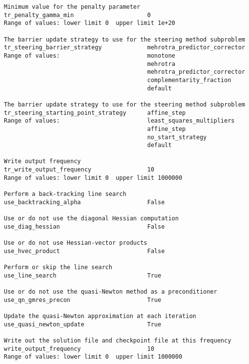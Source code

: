 \documentclass[12pt]{article}
\begin{document}
{\begin{verbatim}
Minimum value for the penalty parameter
tr_penalty_gamma_min                     0
Range of values: lower limit 0  upper limit 1e+20

The barrier update strategy to use for the steering method subproblem
tr_steering_barrier_strategy             mehrotra_predictor_corrector
Range of values:                         monotone
                                         mehrotra
                                         mehrotra_predictor_corrector
                                         complementarity_fraction
                                         default

The barrier update strategy to use for the steering method subproblem
tr_steering_starting_point_strategy      affine_step
Range of values:                         least_squares_multipliers
                                         affine_step
                                         no_start_strategy
                                         default

Write output frequency
tr_write_output_frequency                10
Range of values: lower limit 0  upper limit 1000000

Perform a back-tracking line search
use_backtracking_alpha                   False

Use or do not use the diagonal Hessian computation
use_diag_hessian                         False

Use or do not use Hessian-vector products
use_hvec_product                         False

Perform or skip the line search
use_line_search                          True

Use or do not use the quasi-Newton method as a preconditioner
use_qn_gmres_precon                      True

Update the quasi-Newton approximation at each iteration
use_quasi_newton_update                  True

Write out the solution file and checkpoint file at this frequency
write_output_frequency                   10
Range of values: lower limit 0  upper limit 1000000
\end{verbatim}}





\appendix
\end{document}
